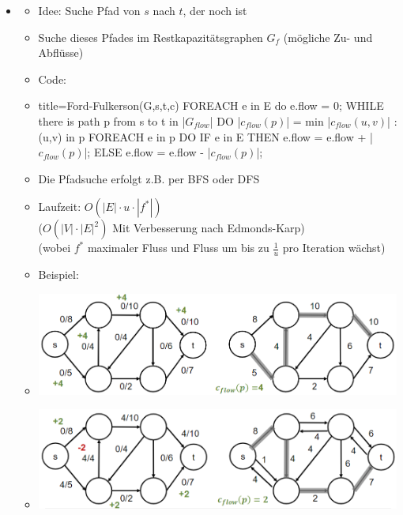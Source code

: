 \documentclass[
    ngerman,
    color=3b,
    dark_mode,
    load_common, %
    summary,
    boxarc,
]{tuda_summary}
\begin{document}
\begin{itemize}
    \item {}
          \begin{itemize}
              \item Idee: Suche Pfad von $s$ nach $t$, der noch  ist
              \item Suche dieses Pfades im Restkapazitätsgraphen $G_f$ (mögliche Zu- und Abflüsse)
              \item Code:
              \item[]%
                    \begin{codeBlock}[autogobble,escapeinside=||]{title={Ford-Fulkerson(G,s,t,c)}}
                    FOREACH e in E do e.flow = 0;
                    WHILE there is path p from s to t in |$G_{flow}$| DO
                        |$c_{flow}(p)$| = min {|$c_{flow}(u,v)$| : (u,v) in p}
                        FOREACH e in p DO
                            IF e in E THEN
                                e.flow = e.flow + |$c_{flow}(p)$|;
                            ELSE
                                e.flow = e.flow - |$c_{flow}(p)$|;
                    \end{codeBlock}
              \item Die Pfadsuche erfolgt z.B. per BFS oder DFS
              \item Laufzeit: $O(|E| \cdot u \cdot |f^*|)$ \\
                    ($O(|V| \cdot |E|^2)$ Mit Verbesserung nach Edmonds-Karp) \\
                    (wobei $f^*$ maximaler Fluss und Fluss um bis zu $\frac{1}{u}$ pro Iteration wächst)
                    \pagebreak
              \item Beispiel:
              \item[] \includegraphics[width=12cm]{pictures/fordbsp1.PNG}
              \item[] \includegraphics[width=12cm]{pictures/fordbsp2.PNG}
          \end{itemize}
\end{itemize}
\clearpage
\end{document}
